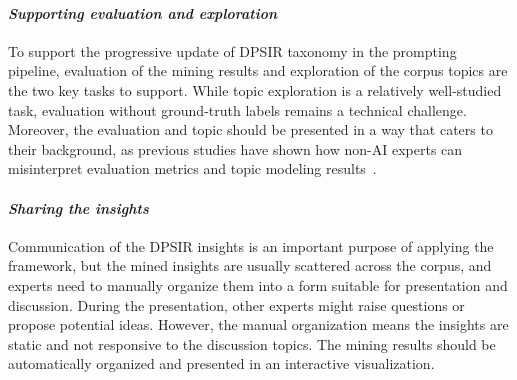 \paragraph{\textit{Supporting evaluation and exploration}}
To support the progressive update of DPSIR taxonomy in the prompting pipeline, evaluation of the mining results and exploration of the corpus topics are the two key tasks to support. 
While topic exploration is a relatively well-studied task, evaluation without ground-truth labels remains a technical challenge. 
Moreover, the evaluation and topic should be presented in a way that caters to their background, as previous studies have shown how non-AI experts can misinterpret evaluation metrics and topic modeling results~\cite{liao2020questionAI, lee2017humantouch}.

\paragraph{\textit{Sharing the insights}} Communication of the DPSIR insights is an important purpose of applying the framework, but the mined insights are usually scattered across the corpus, and experts need to manually organize them into a form suitable for presentation and discussion. During the presentation, other experts might raise questions or propose potential ideas. However, the manual organization means the insights are static and not responsive to the discussion topics. The mining results should be automatically organized and presented in an interactive visualization.

